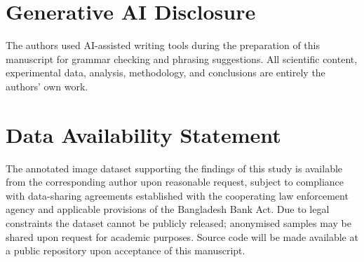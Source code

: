\documentclass[10pt,a4paper,twocolumn,twoside]{article}
\begin{document}
\section*{Generative AI Disclosure}

The authors used AI-assisted writing tools during the preparation of
this manuscript for grammar checking and phrasing suggestions. All
scientific content, experimental data, analysis, methodology, and
conclusions are entirely the authors' own work.

\section*{Data Availability Statement}

The annotated image dataset supporting the findings of this study is
available from the corresponding author upon reasonable request,
subject to compliance with data-sharing agreements established with
the cooperating law enforcement agency and applicable provisions of
the Bangladesh Bank Act. Due to legal constraints the dataset cannot
be publicly released; anonymised samples may be shared upon request
for academic purposes. Source code will be made available at a public
repository upon acceptance of this manuscript.
\end{document}
